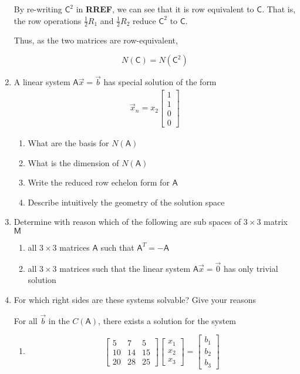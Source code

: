 \documentclass[a4paper, 11pt]{article}
\newcommand{\mat}[1]{\boldsymbol { \mathsf{#1}} }
\begin{document}
\begin{enumerate}
	    By re-writing $\mat{C}^2$ in \textbf{RREF}, we can see that it is row equivalent to $\mat{C}$. That is, the row operations $\frac{1}{2}R_1$ and $\frac{1}{2}R_2$ reduce $\mat{C}^2$ to $\mat{C}$.
	    
	    Thus, as the two matrices are row-equivalent,
	    
	    \begin{equation*}
	        N(\mat{C}) = N(\mat C^2)
	    \end{equation*}
    
\item A linear system $\mat A \vec x = \vec b$ has special solution of the form
\begin{align}
 \vec x_n = x_2 \begin{bmatrix} 1 \\ 1 \\ 0 \\ 0 \end{bmatrix}
 \end{align} 
\begin{enumerate}[label=(\alph*)]
\item What are the basis for $N(\mat A)$
\item What is the dimension of $N(\mat A)$
\item Write the reduced row echelon form for $\mat A$
\item Describe intuitively the geometry of the solution space
\end{enumerate}

\item Determine with reason which of the following are sub spaces of $3 \times 3$ matrix $\mat M$
\begin{enumerate}[label=(\alph*)]
\item all $3 \times 3$ matrices $\mat A$ such that $\mat A^T = -\mat A$
\item all $3 \times 3$ matrices such that the linear system $\mat A \vec x = \vec 0$ has only trivial solution
\end{enumerate}



\item For which right sides are these systems solvable? Give your reasons

For all $\vec b$ in the $C(\mat A)$, there exists a solution for the system

\begin{enumerate}
\item
\[ 
\left[ \begin{array}{ccc}
5  &   7 &  5\\
10  &   14 &  15\\
20 & 28 & 25
\end{array} \right]
%
\left[ \begin{array}{c}
 x_1\\
 x_2\\
x_3 
\end{array} \right]
%
= \left[ \begin{array}{c}
 b_1\\
 b_2\\
 b_3 
\end{array} \right]
\]


\end{enumerate}
\end{enumerate}
\end{document}
